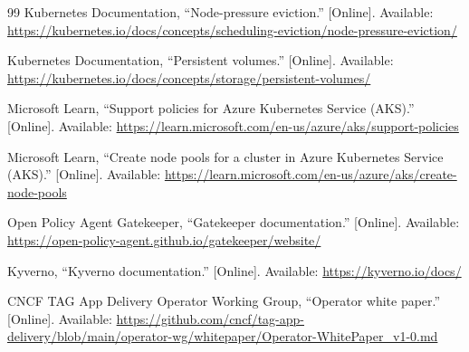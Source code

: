 \documentclass[10pt,journal]{IEEEtran}
\begin{document}
\begin{thebibliography}{99}
Kubernetes Documentation, ``Node-pressure eviction.'' [Online]. Available: \url{https://kubernetes.io/docs/concepts/scheduling-eviction/node-pressure-eviction/}

Kubernetes Documentation, ``Persistent volumes.'' [Online]. Available: \url{https://kubernetes.io/docs/concepts/storage/persistent-volumes/}

Microsoft Learn, ``Support policies for Azure Kubernetes Service (AKS).'' [Online]. Available: \url{https://learn.microsoft.com/en-us/azure/aks/support-policies}

Microsoft Learn, ``Create node pools for a cluster in Azure Kubernetes Service (AKS).'' [Online]. Available: \url{https://learn.microsoft.com/en-us/azure/aks/create-node-pools}

Open Policy Agent Gatekeeper, ``Gatekeeper documentation.'' [Online]. Available: \url{https://open-policy-agent.github.io/gatekeeper/website/}

Kyverno, ``Kyverno documentation.'' [Online]. Available: \url{https://kyverno.io/docs/}

CNCF TAG App Delivery Operator Working Group, ``Operator white paper.'' [Online]. Available: \url{https://github.com/cncf/tag-app-delivery/blob/main/operator-wg/whitepaper/Operator-WhitePaper_v1-0.md}
\end{thebibliography}
\end{document}
